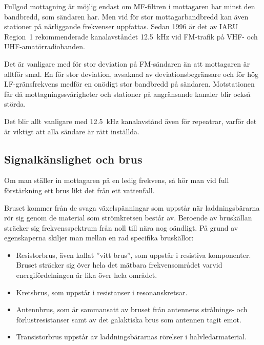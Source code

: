 Fullgod mottagning är möjlig endast om MF-filtren i mottagaren har
minst den bandbredd, som sändaren har.
Men vid för stor mottagarbandbredd kan även stationer på närliggande frekvenser
uppfattas.
Sedan 1996 är det av IARU Region~1 rekommenderade kanalavståndet
\SI{12,5}{\kilo\hertz} vid FM-trafik på VHF- och UHF-amatörradiobanden.

Det är vanligare med för stor deviation på FM-sändaren än att
mottagaren är alltför smal.
En för stor deviation, avsaknad av deviationsbegränsare och för hög
LF-gränsfrekvens medför en onödigt stor bandbredd på sändaren.
Motstationen får då mottagningssvårigheter och stationer på angränsande
kanaler blir också störda.

Det blir allt vanligare med \SI{12,5}{\kilo\hertz} kanalavstånd även för
repeatrar, varför det är viktigt att alla sändare är rätt inställda.

\subsection{Signalkänslighet och brus}
\label{signalkänslighet_brus}

Om man ställer in mottagaren på en ledig frekvens, så hör man vid full
förstärkning ett brus likt det från ett vattenfall.

Bruset kommer från de svaga växelspänningar som uppstår när
laddningsbärarna rör sig genom de material som strömkretsen består av.
Beroende av bruskällan sträcker sig frekvensspektrum från noll
till nära nog oändligt.
På grund av egenskaperna skiljer man mellan en rad specifika bruskällor:

\begin{itemize}
\item Resistorbrus, även kallat ''vitt brus'', som uppstår i resistiva
  komponenter.
  Bruset sträcker sig över hela det mätbara frekvensområdet varvid
  energifördelningen är lika över hela området.

\item Kretsbrus, som uppstår i resistanser i resonanskretsar.

\item Antennbrus, som är sammansatt av bruset från antennens
  strålnings- och förlustresistanser samt av det galaktiska brus som
  antennen tagit emot.

\item Transistorbrus uppstår av laddningsbärarnas rörelser i
  halvledarmaterial.
\end{itemize}

